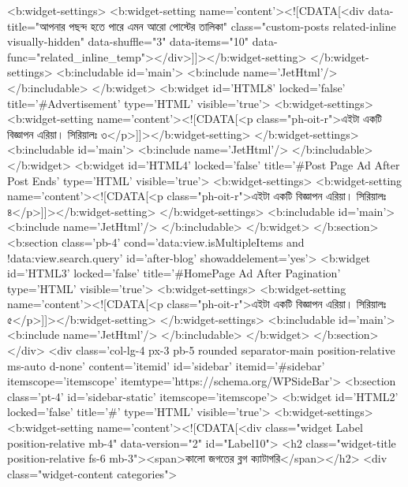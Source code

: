 {{{{    <b:widget-settings>
      <b:widget-setting name='content'><![CDATA[<div data-title="আপনার পছন্দ হতে পারে এমন আরো পোস্টের তালিকা" class="custom-posts related-inline visually-hidden" data-shuffle="3" data-items="10" data-func="related_inline_temp"></div>]]></b:widget-setting>
    </b:widget-settings>
    <b:includable id='main'>
      <b:include name='JetHtml'/>
    </b:includable>
  </b:widget>
  <b:widget id='HTML8' locked='false' title='#Advertisement' type='HTML' visible='true'>
    <b:widget-settings>
      <b:widget-setting name='content'><![CDATA[<p class="ph-oit-r">এইটা একটি বিজ্ঞাপন এরিয়া। সিরিয়ালঃ ৩</p>]]></b:widget-setting>
    </b:widget-settings>
    <b:includable id='main'>
      <b:include name='JetHtml'/>
    </b:includable>
  </b:widget>
  <b:widget id='HTML4' locked='false' title='#Post Page Ad After Post Ends' type='HTML' visible='true'>
    <b:widget-settings>
      <b:widget-setting name='content'><![CDATA[<p class="ph-oit-r">এইটা একটি বিজ্ঞাপন এরিয়া। সিরিয়ালঃ ৪</p>]]></b:widget-setting>
    </b:widget-settings>
    <b:includable id='main'>
      <b:include name='JetHtml'/>
    </b:includable>
  </b:widget>
</b:section>
<b:section class='pb-4' cond='data:view.isMultipleItems and !data:view.search.query' id='after-blog' showaddelement='yes'>
  <b:widget id='HTML3' locked='false' title='#HomePage Ad After Pagination' type='HTML' visible='true'>
    <b:widget-settings>
      <b:widget-setting name='content'><![CDATA[<p class="ph-oit-r">এইটা একটি বিজ্ঞাপন এরিয়া। সিরিয়ালঃ ৫</p>]]></b:widget-setting>
    </b:widget-settings>
    <b:includable id='main'>
      <b:include name='JetHtml'/>
    </b:includable>
  </b:widget>
</b:section>
</div>
<div class='col-lg-4 px-3 pb-5 rounded separator-main position-relative ms-auto d-none' content='itemid' id='sidebar' itemid='#sidebar' itemscope='itemscope' itemtype='https://schema.org/WPSideBar'>
<b:section class='pt-4' id='sidebar-static' itemscope='itemscope'>
  <b:widget id='HTML2' locked='false' title='#' type='HTML' visible='true'>
    <b:widget-settings>
      <b:widget-setting name='content'><![CDATA[<div class="widget Label position-relative mb-4" data-version="2" id="Label10">
<h2 class="widget-title position-relative fs-6 mb-3"><span>কালো জগতের  ব্লগ ক্যাটাগরি</span></h2>
<div class="widget-content categories">
}}}}
